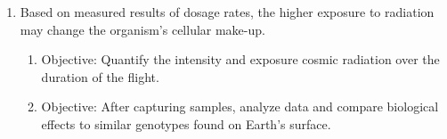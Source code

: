 \begin{enumerate}
\item Based on measured results of dosage rates, the higher exposure to radiation may change the organism's cellular make-up.
	\begin{enumerate}
	\item Objective: Quantify the intensity and exposure cosmic radiation over the duration of the flight.
	\item Objective: After capturing samples, analyze data and compare biological effects to similar genotypes found on Earth's surface.
	\end{enumerate}
\end{enumerate}
